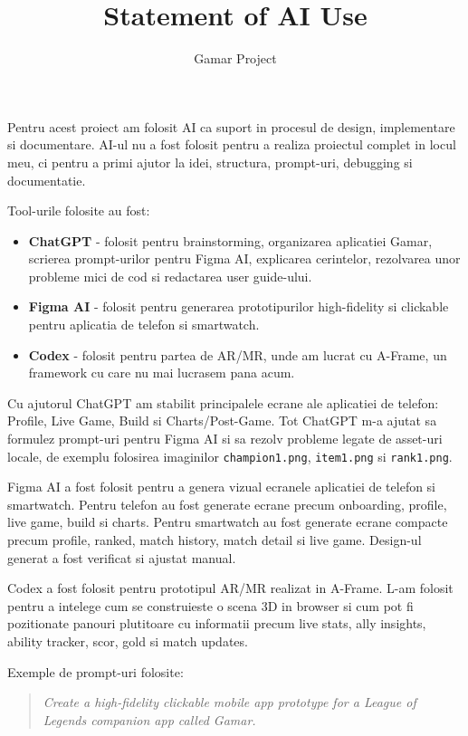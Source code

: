 \documentclass[12pt,a4paper]{article}
\title{\textbf{Statement of AI Use}}
\author{Gamar Project}
\date{}
\begin{document}
\maketitle

Pentru acest proiect am folosit AI ca suport in procesul de design, implementare si documentare. AI-ul nu a fost folosit pentru a realiza proiectul complet in locul meu, ci pentru a primi ajutor la idei, structura, prompt-uri, debugging si documentatie.

Tool-urile folosite au fost:

\begin{itemize}[noitemsep]
    \item \textbf{ChatGPT} - folosit pentru brainstorming, organizarea aplicatiei Gamar, scrierea prompt-urilor pentru Figma AI, explicarea cerintelor, rezolvarea unor probleme mici de cod si redactarea user guide-ului.
    \item \textbf{Figma AI} - folosit pentru generarea prototipurilor high-fidelity si clickable pentru aplicatia de telefon si smartwatch.
    \item \textbf{Codex} - folosit pentru partea de AR/MR, unde am lucrat cu A-Frame, un framework cu care nu mai lucrasem pana acum.
\end{itemize}

Cu ajutorul ChatGPT am stabilit principalele ecrane ale aplicatiei de telefon: Profile, Live Game, Build si Charts/Post-Game. Tot ChatGPT m-a ajutat sa formulez prompt-uri pentru Figma AI si sa rezolv probleme legate de asset-uri locale, de exemplu folosirea imaginilor \texttt{champion1.png}, \texttt{item1.png} si \texttt{rank1.png}.

Figma AI a fost folosit pentru a genera vizual ecranele aplicatiei de telefon si smartwatch. Pentru telefon au fost generate ecrane precum onboarding, profile, live game, build si charts. Pentru smartwatch au fost generate ecrane compacte precum profile, ranked, match history, match detail si live game. Design-ul generat a fost verificat si ajustat manual.

Codex a fost folosit pentru prototipul AR/MR realizat in A-Frame. L-am folosit pentru a intelege cum se construieste o scena 3D in browser si cum pot fi pozitionate panouri plutitoare cu informatii precum live stats, ally insights, ability tracker, scor, gold si match updates.

Exemple de prompt-uri folosite:

\begin{quote}
\textit{Create a high-fidelity clickable mobile app prototype for a League of Legends companion app called Gamar.}
\end{quote}
\end{document}
